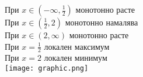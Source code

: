 \documentclass{article}
\begin{document}
\vspace{1cm}

\begin{center}
    При $x \in (-\infty, \frac{1}{2})$ монотонно расте \\
    \vspace{1cm}
    При $x \in (\frac{1}{2}, 2)$ монотонно намалява \\
    \vspace{1cm}
    При $x \in (2, \infty)$ монотонно расте \\
    \vspace{1cm}
    При $x = \frac{1}{2}$ локален максимум \\
    \vspace{1cm}
    При $x = 2$ локален минимум \\
    \vspace{1cm}
    \vspace{2cm}
    \texttt{[image: graphic.png]}
\end{center}
\end{document}
